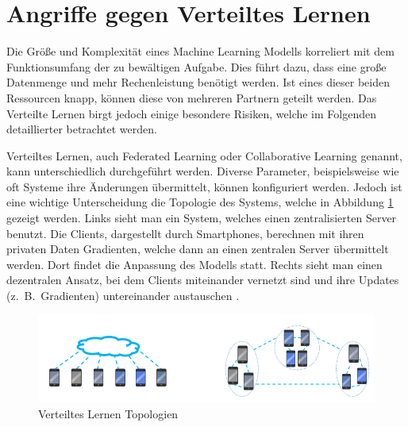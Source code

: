 \section{Angriffe gegen Verteiltes Lernen}\label{sec:angriffe_verteiltes_lernen}

Die Größe und Komplexität eines Machine Learning Modells korreliert mit dem Funktionsumfang der zu bewältigen Aufgabe.
Dies führt dazu, dass eine große Datenmenge und mehr Rechenleistung benötigt werden.
Ist eines dieser beiden Ressourcen knapp, können diese von mehreren Partnern geteilt werden.
Das Verteilte Lernen birgt jedoch einige besondere Risiken, welche im Folgenden detaillierter betrachtet werden.

Verteiltes Lernen, auch Federated Learning oder Collaborative Learning genannt, kann unterschiedlich durchgeführt werden. 
Diverse Parameter, beispielsweise wie oft Systeme ihre Änderungen übermittelt, können konfiguriert werden.
Jedoch ist eine wichtige Unterscheidung die Topologie des Systems, welche in Abbildung \ref{fig:federated_learning_topo} gezeigt werden.
Links sieht man ein System, welches einen zentralisierten Server benutzt. 
Die Clients, dargestellt durch Smartphones, berechnen mit ihren privaten Daten Gradienten, welche dann an einen zentralen Server übermittelt werden. 
Dort findet die Anpassung des Modells statt.
Rechts sieht man einen dezentralen Ansatz, bei dem Clients miteinander vernetzt sind und ihre Updates (z.\ B.\ Gradienten) untereinander austauschen \cite{P-89}. 

\begin{figure}[!htb]
    \centering
    \includegraphics[width=12cm]{figures/federated_learning}
    \caption{Verteiltes Lernen Topologien \cite{P-89}}
    \label{fig:federated_learning_topo}
\end{figure} 

